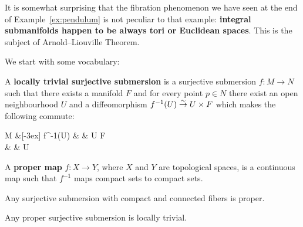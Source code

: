 \documentclass[main.tex]{subfiles}
\begin{document}
It is somewhat surprising that the fibration phenomenon we have seen at the end of Example~\ref{ex:pendulum} is not peculiar to that example: \textbf{integral submanifolds happen to be always tori or Euclidean spaces}. This is the subject of Arnold--Liouville Theorem.

We start with some vocabulary:

\begin{definition}
	A \textbf{locally trivial surjective submersion} is a surjective submersion $f: M \to N$ such that there exists a manifold $F$ and for every point $p \in N$ there exist an open neighbourhood $U$ and a diffeomorphism $f^{-1}(U) \overset{\sim}\to U \times F$ which makes the following commute:
	\begin{diagram}
		M  \&[-3ex] f^{-1}(U)   \& \& U \times F \\
		\& \& U
	\end{diagram}
\end{definition}

\begin{definition}
	A \textbf{proper map} $f: X \to Y$, where $X$ and $Y$ are topological spaces, is a continuous map such that $f^{-1}$ maps compact sets to compact sets.
\end{definition}

\begin{lemma}
\label{lemma:subm_is_proper}
	Any surjective submersion with compact and connected fibers is proper.
\end{lemma}

\begin{lemma}[Ehresmann]
\label{lemma:ehresmann}
	Any proper surjective submersion is locally trivial.
\end{lemma}
\end{document}
